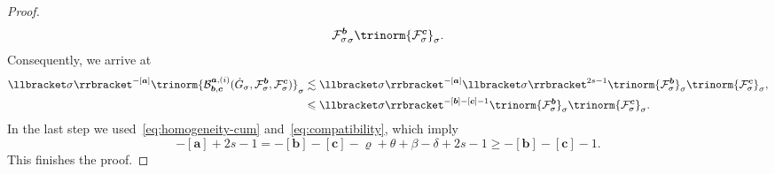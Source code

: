 \documentclass{article}
\numberwithin{equation}{section}
\theoremstyle{plain}
\theoremstyle{definition}
\begin{document}
\begin{proof}
\begin{align*}
{    \mathcal{F}^{\boldsymbol{b}}_{\sigma} }_{\sigma}  \trinorm{
    \mathcal{F}^{\boldsymbol{c}}_{\sigma} }_{\sigma} .
  \end{align*}
  Consequently, we arrive at
  \[ \begin{aligned}
       \llbracket \sigma \rrbracket^{- [\boldsymbol{a}]}  \trinorm{
       \mathcal{B}^{\boldsymbol{a}, (i)}_{\boldsymbol{b}, \boldsymbol{c}}
       (\dot{G}_{\sigma}, \mathcal{F}^{\boldsymbol{b}}_{\sigma},
       \mathcal{F}^{\boldsymbol{c}}_{\sigma}) }_{\sigma} & \lesssim
       \llbracket \sigma \rrbracket^{- [\boldsymbol{a}]}  \llbracket \sigma
       \rrbracket^{2 s - 1}  \trinorm{ \mathcal{F}^{\boldsymbol{b}}_{\sigma}
       }_{\sigma}  \trinorm{ \mathcal{F}^{\boldsymbol{c}}_{\sigma}
       }_{\sigma},\\
       & \leqslant  \llbracket \sigma \rrbracket^{- [\boldsymbol{b}] - [\boldsymbol{c}]
       - 1}  \trinorm{ \mathcal{F}^{\boldsymbol{b}}_{\sigma}
       }_{\sigma}  \trinorm{ \mathcal{F}^{\boldsymbol{c}}_{\sigma}
       }_{\sigma} .
     \end{aligned} \]
  In the last step we used~\eqref{eq:homogeneity-cum}
  and~\eqref{eq:compatibility}, which imply
  \[ - [\boldsymbol{a}] + 2 s - 1 = - [\boldsymbol{b}] - [\boldsymbol{c}] - \varrho
     + \theta + \beta - \delta + 2 s - 1 \geqslant - [\boldsymbol{b}] -
     [\boldsymbol{c}] - 1. \]
  This finishes the proof.
\end{proof}
\end{document}
